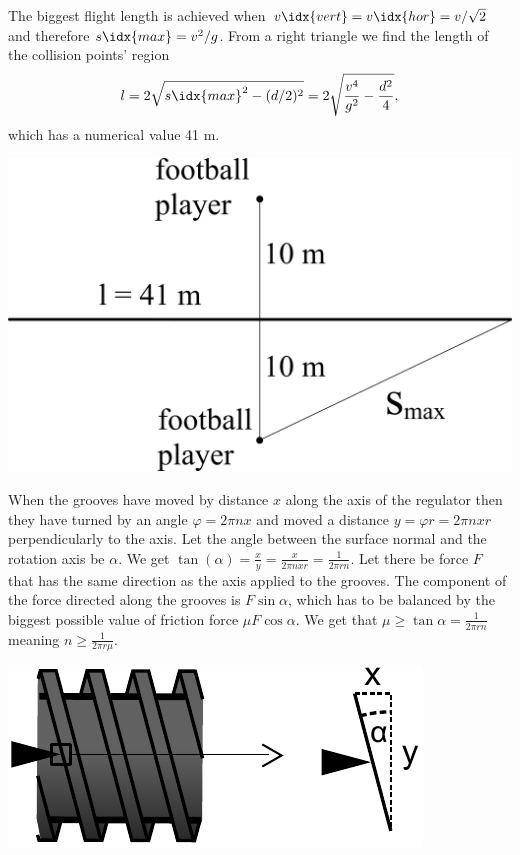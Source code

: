 \documentclass[11pt]{article}
\begin{document}
The biggest flight length is achieved when $v\idx{vert}=v\idx{hor}=v / \sqrt{2}$ and therefore $s\idx{max}=v^2 / g$. From a right triangle we find the length of the collision points’ region
\[
l=2\sqrt{{s\idx{max}}^2-(d/2)^2}=2\sqrt{\frac{v^4}{g^2}-\frac{d^2}{4}},
\] 
which has a numerical value 41 m. 
\begin{center}
\includegraphics[width=0.5\linewidth]{2013-v3g-09-jalgpallurid_ing}
\end{center}
\probend
\bigskip


\solueng
When the grooves have moved by distance $x$ along the axis of the regulator then they have turned by an angle $\varphi=2\pi nx$ and moved a distance $y=\varphi r=2\pi nxr$ perpendicularly to the axis. Let the angle between the surface normal and the rotation axis be $\alpha$. We get $\tan(\alpha)=\frac{x}{y}=\frac{x}{2\pi nxr}=\frac{1}{2\pi rn}$. Let there be force $F$ that has the same direction as the axis applied to the grooves. The component of the force directed along the grooves is $F\sin\alpha$, which has to be balanced by the biggest possible value of friction force $\mu F\cos\alpha$. We get that $\mu\geq\tan\alpha=\frac{1}{2\pi rn}$ meaning $n\ge\frac{1}{2\pi r\mu}$.
\begin{center}
\includegraphics[width=0.5\linewidth]{2015-lahg-09-mutriv6ti_lahendus}
\end{center}
\probend
\bigskip

\end{document}
